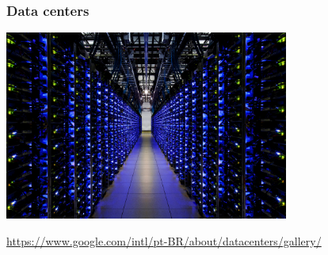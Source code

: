 \documentclass[xcolor={usenames,dvipsnames},12pt,presentation,aspectratio=169]{beamer}
\begin{document}
\begin{frame}
  \frametitle{Data centers}
  \vspace{-3mm}
  \begin{center}
	\includegraphics[width=0.7\textwidth]{douglas-county-servers.jpg}
  \end{center}
  {\footnotesize \url{https://www.google.com/intl/pt-BR/about/datacenters/gallery/}}
\end{frame}
\end{document}
